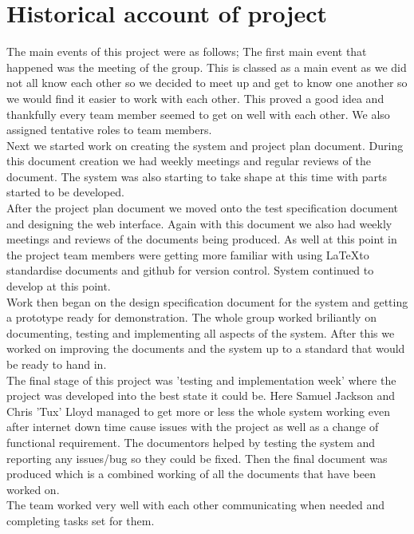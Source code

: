 \documentclass{project}
\begin{document}
\section{Historical account of project}
The main events of this project were as follows;
The first main event that happened was the meeting of the group. This is classed as a main event as we did not all know each other so we decided to meet up and get to know one another so we would find it easier to work with each other. This proved a good idea and thankfully every team member seemed to get on well with each other. We also assigned tentative roles to team members.
\\
Next we started work on creating the system and project plan document. During this document creation we had weekly meetings and regular reviews of the document. The system was also starting to take shape at this time with parts started to be developed. 
\\
After the project plan document we moved onto the test specification document and designing the web interface. Again with this document we also had weekly meetings and reviews of the documents being produced. As well at this point in the project team members were getting more familiar with using \LaTeX to standardise documents and github for version control. System continued to develop at this point.
\\
Work then began on the design specification document for the system and getting a prototype ready for demonstration. The whole group worked briliantly on documenting, testing and implementing all aspects of the system. After this we worked on improving the documents and the system up to a standard that would be ready to hand in.
\\
The final stage of this project was 'testing and implementation week' where the project was developed into the best state it could be. Here Samuel Jackson and Chris 'Tux' Lloyd managed to get more or less the whole system working even after internet down time cause issues with the project as well as a change of functional requirement. The documentors helped by testing the system and reporting any issues/bug so they could be fixed. Then the final document was produced which is a combined working of all the documents that have been worked on.
\\
The team worked very well with each other communicating when needed and completing tasks set for them. 
\end{document}
